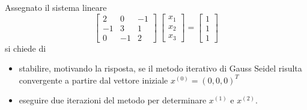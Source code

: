  Assegnato il sistema lineare
\[ \left[ \begin{array}{ccc}  2 & 0 & -1\\ -1 & 3 & 1\\ 0 & -1&2
\end{array} \right] \ \left[ \begin{array}{c}  x_1 \\ x_2 \\
x_3
\end{array} \right] =
\left[ \begin{array}{c}  1 \\ 1 \\ 1
\end{array} \right] \]
si chiede di
\begin{itemize}
\item
stabilire, motivando la risposta, se il metodo iterativo di
Gauss Seidel risulta convergente a partire dal vettore iniziale
$x^{(0)}=(0,0,0)^T$
\item eseguire due iterazioni del metodo per determinare $x^{(1)}$ e
$x^{(2)}$.
\end{itemize} 